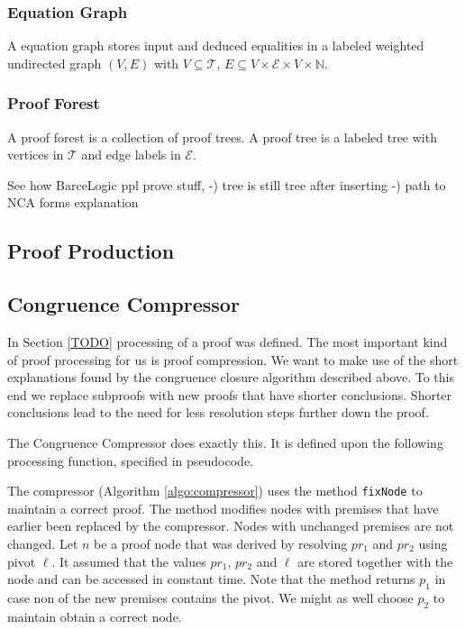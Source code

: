 \subsubsection*{Equation Graph}

A equation graph stores input and deduced equalities in a labeled weighted undirected graph $(V,E)$ with 
$V \subseteq \mathcal{T}$, $E \subseteq V \times \mathcal{E} \times V \times \mathbb{N}$.







\subsubsection*{Proof Forest}

A proof forest is a collection of proof trees.
A proof tree is a labeled tree with vertices in $\mathcal{T}$ and edge labels in $\mathcal{E}$.



See how BarceLogic ppl prove stuff,
-) tree is still tree after inserting
-) path to NCA forms explanation


\subsection*{Proof Production}



\subsection*{Congruence Compressor}

In Section \ref{TODO} processing of a proof was defined.
The most important kind of proof processing for us is proof compression.
We want to make use of the short explanations found by the congruence closure algorithm described above.
To this end we replace subproofs with new proofs that have shorter conclusions.
Shorter conclusions lead to the need for less resolution steps further down the proof.

The Congruence Compressor does exactly this. It is defined upon the following processing function, specified in pseudocode.



The compressor (Algorithm \ref{algo:compressor}) uses the method \texttt{fixNode} to maintain a correct proof.
The method modifies nodes with premises that have earlier been replaced by the compressor. 
Nodes with unchanged premises are not changed.
Let $n$ be a proof node that was derived by resolving $pr_1$ and $pr_2$ using pivot $\ell$.
It assumed that the values $pr_1$, $pr_2$ and $\ell$ are stored together with the node and can be accessed in constant time.
Note that the method returns $p_1$ in case non of the new premises contains the pivot.
We might as well choose $p_2$ to maintain obtain a correct node.

